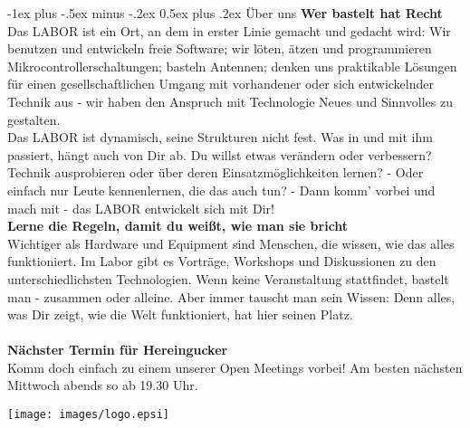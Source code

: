 \documentclass[11pt,landscape,a4paper]{article}
\makeatletter
\renewcommand{\section}{\@startsection{section}{1}{0mm}%
    {-1ex plus -.5ex minus -.2ex}%
    {0.5ex plus .2ex}%
    {\normalfont\large\bfseries}}
\makeatother
\begin{document}
\begin{multicols}{3}
\section{\"Uber uns}
{\bf Wer bastelt hat Recht}\\
Das LABOR ist ein Ort, an dem in erster Linie gemacht und gedacht wird:
Wir benutzen und entwickeln freie Software; wir l\"oten, \"atzen und
programmieren Mikrocontrollerschaltungen; basteln Antennen; denken uns
praktikable L\"osungen f\"ur einen gesellschaftlichen Umgang mit vorhandener
oder sich entwickelnder Technik aus - wir haben den Anspruch mit Technologie
Neues und Sinnvolles zu gestalten.\\
Das LABOR ist dynamisch, seine Strukturen nicht fest. Was in und mit
ihm passiert, h\"angt auch von Dir ab. Du willst etwas ver\"andern oder
verbessern? Technik ausprobieren oder \"uber deren Einsatzm\"oglichkeiten
lernen? - Oder einfach nur Leute kennenlernen, die das auch tun? - Dann
komm' vorbei und mach mit - das LABOR entwickelt sich mit Dir!\\
{\bf Lerne die Regeln, damit du weißt, wie man sie bricht}\\
Wichtiger als Hardware und Equipment sind Menschen, die wissen, wie das alles
funktioniert. Im Labor gibt es Vortr\"age, Workshops und Diskussionen zu
den unterschiedlichsten Technologien. Wenn keine Veranstaltung stattﬁndet,
bastelt man - zusammen oder alleine. Aber immer tauscht man sein Wissen: Denn
alles, was Dir zeigt, wie die Welt funktioniert, hat hier seinen Platz.\\
\\
{\bf N\"achster Termin f\"ur Hereingucker}\\
Komm doch einfach zu einem unserer Open Meetings vorbei! Am besten n\"achsten
Mittwoch abends so ab 19.30 Uhr.\\

\vskip 2cm




\begin{center}
\centering \texttt{[image: images/logo.epsi]}
\end{center}


\end{multicols}
\end{document}
